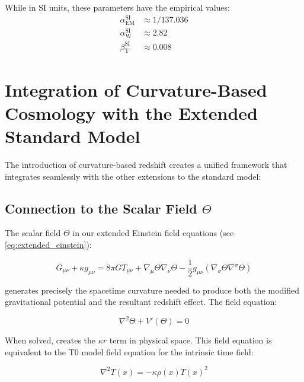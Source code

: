 \documentclass[12pt,a4paper]{article}
\newcommand{\Tfield}{T(x)}
\newcommand{\alphaEM}{\alpha_{\text{EM}}}
\newcommand{\alphaW}{\alpha_{\text{W}}}
\newcommand{\betaT}{\beta_{\text{T}}}
\begin{document}
	While in SI units, these parameters have the empirical values\cite{mohr2018, pascher_params_2025}:
	\begin{align}
		\alphaEM^{\text{SI}} &\approx 1/137.036 \\
		\alphaW^{\text{SI}} &\approx 2.82 \\
		\betaT^{\text{SI}} &\approx 0.008
	\end{align}
	
	\section{Integration of Curvature-Based Cosmology with the Extended Standard Model}
	\label{sec:integration}
	
	The introduction of curvature-based redshift creates a unified framework that integrates seamlessly with the other extensions to the standard model:
	
	\subsection{Connection to the Scalar Field $\Theta$}
	\label{subsec:theta_connection}
	
	The scalar field $\Theta$ in our extended Einstein field equations (see \cref{eq:extended_einstein}):
	
	\begin{equation}
		G_{\mu\nu} + \kappa g_{\mu\nu} = 8\pi G T_{\mu\nu} + \nabla_{\mu}\Theta\nabla_{\nu}\Theta - \frac{1}{2}g_{\mu\nu}(\nabla_{\sigma}\Theta\nabla^{\sigma}\Theta)
	\end{equation}
	
	generates precisely the spacetime curvature needed to produce both the modified gravitational potential and the resultant redshift effect\cite{pascher_emergente_gravitation_2025}. The field equation:
	
	\begin{equation}
		\label{eq:theta_field_eq}
		\nabla^2\Theta + V'(\Theta) = 0
	\end{equation}
	
	When solved, creates the $\kappa r$ term in physical space. This field equation is equivalent to the T0 model field equation for the intrinsic time field\cite{pascher_lagrange_2025}:
	
	\begin{equation}
		\label{eq:t_field_eq}
		\nabla^2 \Tfield = -\kappa \rho(x) \Tfield^2
	\end{equation}
	
\end{document}

